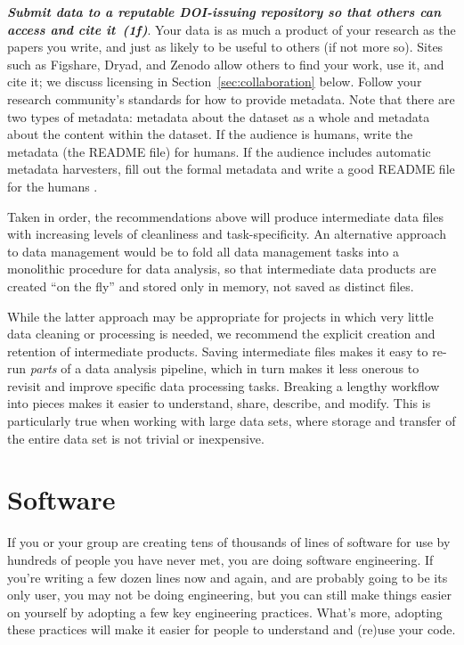 \documentclass[10pt,letterpaper]{article}
\newcommand{\withurl}[2]{{#1}}
\newcommand{\practicesection}[2]{\section{#1}\label{#2}}
\newcommand{\practice}[2]{\textbf{\emph{{#2}~({#1})}}}
\begin{document}
\begin{enumerate}
  \practice{1f}{Submit data to a reputable DOI-issuing repository so
  that others can access and cite it}.  Your data is as much a
  product of your research as the papers you write, and just as likely
  to be useful to others (if not more so).  Sites such as
  \withurl{Figshare}{https://figshare.com/},
  \withurl{Dryad}{http://datadryad.org/}, and
  \withurl{Zenodo}{https://zenodo.org/} allow others to find your
  work, use it, and cite it; we discuss licensing in
  Section~\ref{sec:collaboration} below. Follow your research
  community's standards for how to provide metadata. Note that there
  are two types of metadata: metadata about the dataset as a whole and
  metadata about the content within the dataset. If the audience is
  humans, write the metadata (the README file) for humans. If the
  audience includes automatic metadata harvesters, fill out the formal
  metadata and write a good README file for the humans
  \cite{wickes2015}.

\end{enumerate}

Taken in order, the recommendations above will produce intermediate
data files with increasing levels of cleanliness and
task-specificity. An alternative approach to data management would be
to fold all data management tasks into a monolithic procedure for data
analysis, so that intermediate data products are created ``on the
fly'' and stored only in memory, not saved as distinct files.

While the latter approach may be appropriate for projects in which
very little data cleaning or processing is needed, we recommend the
explicit creation and retention of intermediate products. Saving
intermediate files makes it easy to re-run \emph{parts} of a data
analysis pipeline, which in turn makes it less onerous to revisit and
improve specific data processing tasks. Breaking a lengthy workflow
into pieces makes it easier to understand, share, describe, and
modify. This is particularly true when working with large data sets,
where storage and transfer of the entire data set is not trivial or
inexpensive.

\practicesection{Software}{sec:software}

If you or your group are creating tens of thousands of lines of
software for use by hundreds of people you have never met, you are
doing software engineering. If you're writing a few dozen lines now
and again, and are probably going to be its only user, you may not be
doing engineering, but you can still make things easier on yourself by
adopting a few key engineering practices. What's more, adopting these
practices will make it easier for people to understand and (re)use
your code.
\end{document}

